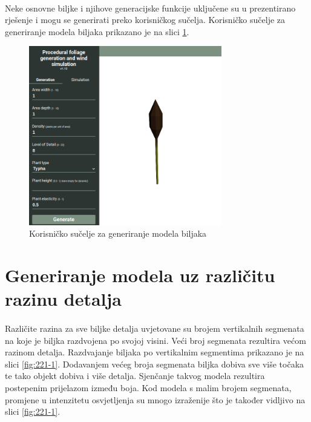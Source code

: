 \documentclass[times, utf8, diplomski]{fer}
\begin{document}
\paragraph{}
Neke osnovne biljke i njihove generacijske funkcije uključene su u prezentirano rješenje i 
mogu se generirati preko korisničkog sučelja. Korisničko sučelje za generiranje modela 
biljaka prikazano je na slici \ref{fig:22-4}.

\begin{figure}[h]
	\centering
	\includegraphics[width=0.75\textwidth]{img/22-4}
	\caption{Korisničko sučelje za generiranje modela biljaka}
	\label{fig:22-4}
\end{figure}

\section{Generiranje modela uz različitu razinu detalja}
\paragraph{}
Različite razina za sve biljke detalja uvjetovane su brojem vertikalnih segmenata na koje je 
biljka razdvojena po svojoj visini. Veći broj segmenata rezultira većom razinom detalja. 
Razdvajanje biljaka po vertikalnim segmentima prikazano je na slici \ref{fig:221-1}. 
Dodavanjem većeg broja segmenata biljka dobiva sve više točaka te tako objekt dobiva 
i više detalja. Sjenčanje takvog modela rezultira postepenim prijelazom između boja. Kod 
modela s malim brojem segmenata, promjene u intenzitetu osvjetljenja su mnogo izraženije što 
je također vidljivo na slici \ref{fig:221-1}.
\end{document}
